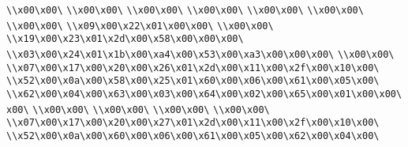 \verb|\\x00\x00\|\newline
\verb|\\x00\x00\|\newline
\verb|\\x00\x00\|\newline
\verb|\\x00\x00\|\newline
\verb|\\x00\x00\|\newline
\verb|\\x00\x00\|\newline
\verb|\\x00\x00\|\newline
\verb|\\x09\x00\x22\x01\x00\x00\|\newline
\verb|\\x00\x00\|\newline
\verb|\\x19\x00\x23\x01\x2d\x00\x58\x00\x00\x00\|\newline
\verb|\\x03\x00\x24\x01\x1b\x00\xa4\x00\x53\x00\xa3\x00\x00\x00\|\newline
\verb|\\x00\x00\|\newline
\verb|\\x07\x00\x17\x00\x20\x00\x26\x01\x2d\x00\x11\x00\x2f\x00\x10\x00\|\newline
\verb|\\x52\x00\x0a\x00\x58\x00\x25\x01\x60\x00\x06\x00\x61\x00\x05\x00\|\newline
\verb|\\x62\x00\x04\x00\x63\x00\x03\x00\x64\x00\x02\x00\x65\x00\x01\x00\x00\x00\|\newline
\verb|\\x00\x00\|\newline
\verb|\\x00\x00\|\newline
\verb|\\x00\x00\|\newline
\verb|\\x00\x00\|\newline
\verb|\\x07\x00\x17\x00\x20\x00\x27\x01\x2d\x00\x11\x00\x2f\x00\x10\x00\|\newline
\verb|\\x52\x00\x0a\x00\x60\x00\x06\x00\x61\x00\x05\x00\x62\x00\x04\x00\|\newline
